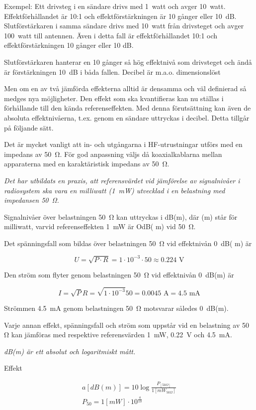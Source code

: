 Exempel: Ett drivsteg i en sändare drivs med 1~watt och avger 10~watt.
Effektförhållandet är 10:1 och effektförstärkningen är 10 gånger
eller 10~dB. Slutförstärkaren i samma sändare drivs med 10~watt från
drivsteget och avger 100~watt till antennen. Även i detta fall är
effektförhållandet 10:1 och effektförstärkningen 10 gånger eller 10
dB.

Slutförstärkaren hanterar en 10 gånger så hög effektnivå som
drivsteget och ändå är förstärkningen 10~dB i båda fallen. Decibel är
m.a.o. dimensionslöst

Men om en av två jämförda effekterna alltid är densamma och väl
definierad så medges nya möjligheter. Den effekt som ska
kvantifieras kan nu ställas i förhållande till den kända
referenseffekten. Med denna förutsättning kan även de absoluta
effektnivåerna, t.ex. genom en sändare uttryckas i decibel. Detta
tillgår på följande sätt.

Det är mycket vanligt att in- och utgångarna i HF-utrustningar utförs
med en impedans av 50~Ω. För god anpassning väljs då koaxialkablarna
mellan apparaterna med en karaktäristisk impedans av 50~Ω.

\emph{Det har utbildats en praxis, att referensvärdet vid jämförelse
  av signalnivåer i radiosystem ska vara en milliwatt (1~mW)
  utvecklad i en belastning med impedansen 50~Ω.}

Signalnivåer över belastningen 50~Ω kan uttryckas i dB(m), där (m)
står för milliwatt, varvid referenseffekten 1~mW är OdB( m) vid 50~Ω.

Det spänningsfall som bildas över belastningen 50~Ω vid effektnivån
0~dB( m) är

\[U = \sqrt{P\cdot R} = 1\cdot 10^{-3} \cdot 50 \approx 0.224 \text{ V}\]

Den ström som flyter genom belastningen 50~Ω vid effektnivån 0~dB(m)
är

\[
I = \sqrt{P}{R} = \sqrt{1\cdot 10^{-3}}{50} = 0.0045 \text{ A} = 4.5 \text{ mA}
\]

Strömmen 4.5~mA genom belastningen 50~Ω motsvarar således 0~dB(m).

Varje annan effekt, spänningsfall och ström som uppstår vid en
belastning av 50 Ω kan jämföras med respektive referensvärden 1~mW,
0.22~V och 4.5~mA.

\emph{dB(m) är ett absolut och logaritmiskt mått.}

Effekt

\begin{gather*}
  a [dB(m)] = 10 \log\frac{P_{[50Ω]}}{1[mW_{50Ω}]} \\
  P_{50} = 1 [mW] \cdot 10^{\frac{a}{10}}
\end{gather*}

